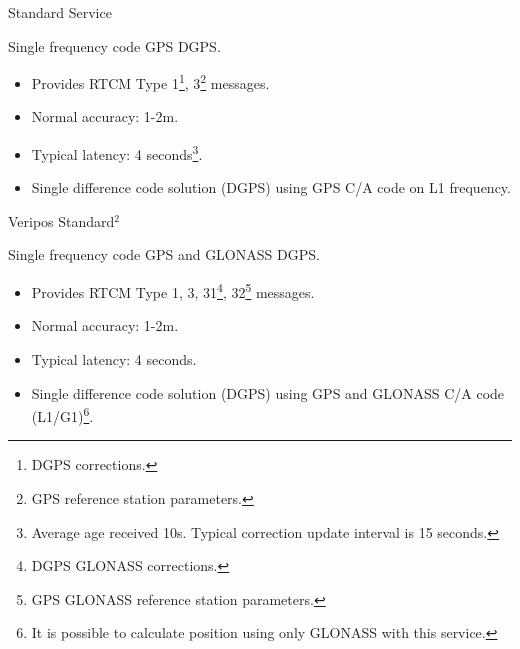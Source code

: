 \documentclass[11pt]{beamer}
\begin{document}
\begin{frame}[allowframebreaks]{Standard Service}

	Single frequency code GPS DGPS.

	\begin{itemize}	
		\item Provides RTCM Type 1\footnote[frame]{DGPS corrections.}, 3\footnote[frame]{GPS reference station parameters.} messages.
		\item Normal accuracy: 1-2m. 
		\item Typical latency: 4 seconds\footnote[frame]{Average age received 10s. Typical correction update interval is 15 seconds.}.
		\item Single difference code solution (DGPS) using GPS C/A code on L1 frequency.
	\end{itemize}	

\end{frame}


\begin{frame}{Veripos Standard$^2$}
	
	Single frequency code GPS and GLONASS DGPS. 

	\begin{itemize}	
		\item Provides RTCM Type 1, 3, 31\footnote{DGPS GLONASS corrections.}, 32\footnote{GPS GLONASS reference station parameters.} messages.
		\item Normal accuracy: 1-2m. 
		\item Typical latency: 4 seconds.
		\item Single difference code solution (DGPS) using GPS and GLONASS C/A code (L1/G1)\footnote[frame]{It is possible to calculate position using only GLONASS with this service.}.
	\end{itemize}	
	
\end{frame}
\end{document}
